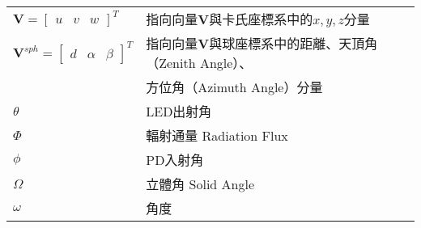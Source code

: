 \begin{longtable}[l]{ll}
    $\boldsymbol{V} =
        \left[\begin{array}{ccc}
        u &v&w
        \end{array}\right]^T$ & 指向向量$\boldsymbol{V}$與卡氏座標系中的$x,y,z$分量\\
    $\boldsymbol{V}^{sph} =
        \left[\begin{array}{ccc}
        d &\alpha&\beta
        \end{array}\right]^T$ & 指向向量$\boldsymbol{V}$與球座標系中的距離、天頂角（Zenith Angle）、\\
        &方位角（Azimuth Angle）分量\\
   
    $\theta$ & LED出射角\\
    $\Phi$ & 輻射通量 Radiation Flux\\
    $\phi$ & PD入射角\\
    $\Omega$ & 立體角 Solid Angle\\
    $\omega$ & 角度\\
\end{longtable}


